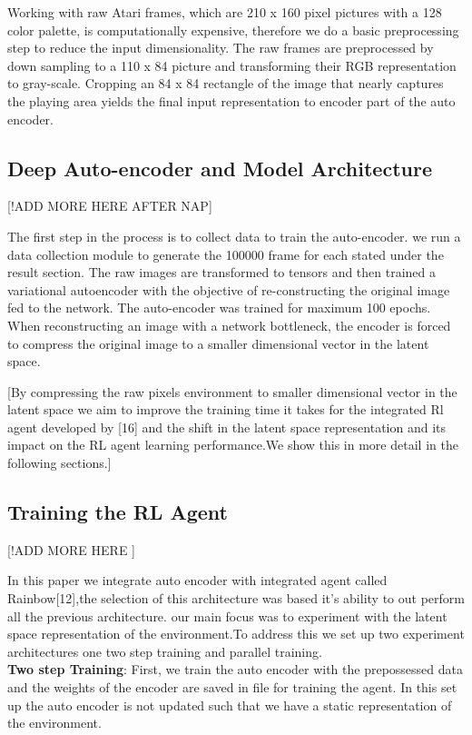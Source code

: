 Working with raw Atari frames, 
which are 210 x 160 pixel pictures with a 
128 color palette, is computationally expensive, therefore we do a 
basic preprocessing step to reduce the input dimensionality. 
The raw frames are preprocessed by down sampling to a 110 x 84 
picture and transforming their RGB representation to gray-scale.
Cropping an 84 x 84 rectangle of the image that nearly 
captures the playing area yields the final input representation to encoder part of the auto encoder.


\subsection{Deep Auto-encoder and Model Architecture}
[!ADD MORE HERE AFTER NAP]

The first step in the process is to collect data to train the auto-encoder. 
we run a data collection module to generate the 100000 frame 
for each stated under the result section.
The raw images are transformed to tensors and then trained a variational autoencoder 
with the objective of re-constructing the original image fed to the network. 
The auto-encoder was trained for maximum  100 epochs.
When reconstructing an image with a network bottleneck, 
the encoder is forced to compress the original image to a smaller dimensional vector in the latent space.

[By compressing the raw pixels environment to smaller dimensional 
vector in the latent space we aim to improve the training 
time it takes for the integrated Rl agent developed by [16] 
and the shift in the latent space representation and its impact on 
the RL agent learning performance.We show this in more detail in the following sections.]


\subsection{Training the RL Agent} [!ADD MORE HERE ]

In this paper we integrate auto encoder with integrated agent 
called Rainbow[12],the selection of this architecture  was 
based it's ability to out perform all the previous architecture.
our main focus was to experiment with the latent space representation 
of the environment.To address this we set up two experiment architectures one two step training and parallel training.\\

\textbf{Two step Training}: First,
we train the auto encoder with the prepossessed data and the 
weights of the encoder are saved in file for training the agent.
In this set up the auto encoder is not updated such that we have a static representation of the environment.

